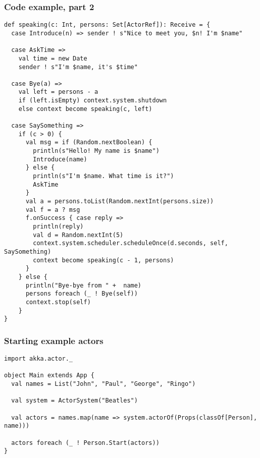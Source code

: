 \begin{frame}[fragile]
\frametitle{Code example, part 2}
\begin{lstlisting}[name=person]
def speaking(c: Int, persons: Set[ActorRef]): Receive = {
  case Introduce(n) => sender ! s"Nice to meet you, $n! I'm $name"

  case AskTime =>
    val time = new Date
    sender ! s"I'm $name, it's $time"

  case Bye(a) =>
    val left = persons - a
    if (left.isEmpty) context.system.shutdown
    else context become speaking(c, left)

  case SaySomething =>
    if (c > 0) {
      val msg = if (Random.nextBoolean) {
        println(s"Hello! My name is $name")
        Introduce(name)
      } else {
        println(s"I'm $name. What time is it?")
        AskTime
      }
      val a = persons.toList(Random.nextInt(persons.size))
      val f = a ? msg
      f.onSuccess { case reply =>
        println(reply)
        val d = Random.nextInt(5)
        context.system.scheduler.scheduleOnce(d.seconds, self, SaySomething)
        context become speaking(c - 1, persons)
      }
    } else {
      println("Bye-bye from " +  name)
      persons foreach (_ ! Bye(self))
      context.stop(self)
    }
}
\end{lstlisting}
\end{frame}

\begin{frame}[fragile]
\frametitle{Starting example actors}
\begin{lstlisting}
import akka.actor._

object Main extends App {
  val names = List("John", "Paul", "George", "Ringo")

  val system = ActorSystem("Beatles")

  val actors = names.map(name => system.actorOf(Props(classOf[Person], name)))

  actors foreach (_ ! Person.Start(actors))
}
\end{lstlisting}
\end{frame}

